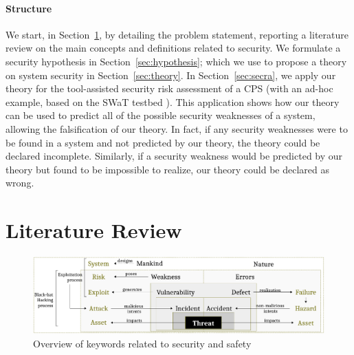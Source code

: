 \documentclass[conference]{IEEEtran}
\begin{document}
\paragraph{Structure} We start, in
Section~\ref{sec:literature}, by detailing the problem statement, reporting a
literature review on the main concepts and definitions related to security.  We
formulate a security hypothesis in Section~\ref{sec:hypothesis}; which we use
to propose a theory on system security in Section~\ref{sec:theory}. In
Section~\ref{sec:secra}, we apply our theory for the tool-assisted security
risk assessment of a CPS (with an ad-hoc example, based on the SWaT testbed
\autocite{Mathur2016swat}).  This application shows how our theory can be used to
predict all of the possible security weaknesses of a system, allowing the
falsification of our theory.  In fact, if any security weaknesses were to be
found in a system and not predicted by our theory, the theory could be declared
incomplete.  Similarly, if a security weakness would be predicted by our theory
but found to be impossible to realize, our theory could be declared as wrong.

\section{Literature Review}\label{sec:literature}
\begin{figure}[t]
	\centering
	\includegraphics[width=.9\textwidth]{safety-security_3.pdf}
	\caption{Overview of keywords related to security and safety}
	\label{fig:safety-security}
\end{figure}
\end{document}
